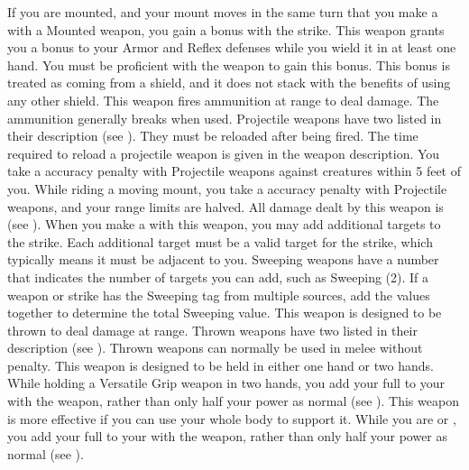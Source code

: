     \label{Mounted Weapon} If you are mounted, and your mount moves in the same turn that you make a  with a Mounted weapon, you gain a   bonus with the strike.
     This weapon grants you a  bonus to your Armor and Reflex defenses while you wield it in at least one hand.
    You must be proficient with the weapon to gain this bonus.
    This bonus is treated as coming from a shield, and it does not stack with the benefits of using any other shield.
     This weapon fires ammunition at range to deal damage.
    The ammunition generally breaks when used.
    Projectile weapons have two  listed in their description (see ).
    They must be reloaded after being fired.
    The time required to reload a projectile weapon is given in the weapon description.
    You take a  accuracy penalty with Projectile weapons against creatures within 5 feet of you.
    While riding a moving mount, you take a  accuracy penalty with Projectile weapons, and your range limits are halved.
     All damage dealt by this weapon is  (see ).
    \label{Sweeping} When you make a   with this weapon, you may add additional targets to the strike.
    Each additional target must be a valid target for the strike, which typically means it must be adjacent to you.
    Sweeping weapons have a number that indicates the number of targets you can add, such as Sweeping (2).
    If a weapon or strike has the Sweeping tag from multiple sources, add the values together to determine the total Sweeping value.
     This weapon is designed to be thrown to deal damage at range.
    Thrown weapons have two  listed in their description (see ).
    Thrown weapons can normally be used in melee without penalty.
     This weapon is designed to be held in either one hand or two hands.
    While holding a Versatile Grip weapon in two hands, you add your full  to your  with the weapon, rather than only half your power as normal (see ).
     This weapon is more effective if you can use your whole body to support it.
    While you are  or , you add your full  to your  with the weapon, rather than only half your power as normal (see ).

